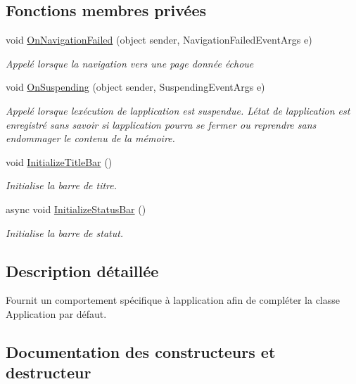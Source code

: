 \subsection*{Fonctions membres privées}
\begin{DoxyCompactItemize}
\item 
void \hyperlink{class_boxes_1_1_app_a8e739ea3879e4d556acc04312bb19e04}{On\+Navigation\+Failed} (object sender, Navigation\+Failed\+Event\+Args e)
\begin{DoxyCompactList}\small\item\em Appelé lorsque la navigation vers une page donnée échoue \end{DoxyCompactList}\item 
void \hyperlink{class_boxes_1_1_app_ac5bc5c73c1fd8c07fd3c8f39799cea6e}{On\+Suspending} (object sender, Suspending\+Event\+Args e)
\begin{DoxyCompactList}\small\item\em Appelé lorsque l\textquotesingle{}exécution de l\textquotesingle{}application est suspendue. L\textquotesingle{}état de l\textquotesingle{}application est enregistré sans savoir si l\textquotesingle{}application pourra se fermer ou reprendre sans endommager le contenu de la mémoire. \end{DoxyCompactList}\item 
void \hyperlink{class_boxes_1_1_app_a5f5216a17874d327f729f926a0421339}{Initialize\+Title\+Bar} ()
\begin{DoxyCompactList}\small\item\em Initialise la barre de titre. \end{DoxyCompactList}\item 
async void \hyperlink{class_boxes_1_1_app_ac9c47d1ed1666dc83f77b5a0b1825b55}{Initialize\+Status\+Bar} ()
\begin{DoxyCompactList}\small\item\em Initialise la barre de statut. \end{DoxyCompactList}\end{DoxyCompactItemize}


\subsection{Description détaillée}
Fournit un comportement spécifique à l\textquotesingle{}application afin de compléter la classe Application par défaut. 



\subsection{Documentation des constructeurs et destructeur}
